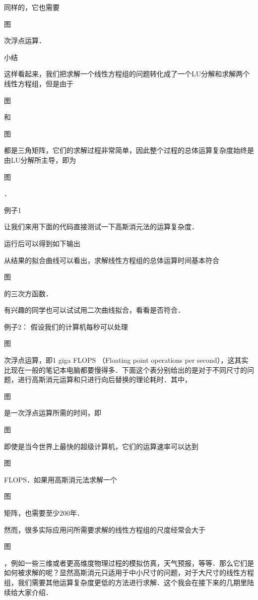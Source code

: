 同样的，它也需要

图

 次浮点运算．

小结

这样看起来，我们把求解一个线性方程组的问题转化成了一个LU分解和求解两个线性方程组，但是由于

图

 和

图

 都是三角矩阵，它们的求解过程非常简单，因此整个过程的总体运算复杂度始终是由LU分解所主导，即为

图

 ．

例子1

让我们来用下面的代码直接测试一下高斯消元法的运算复杂度．

运行后可以得到如下输出

从结果的拟合曲线可以看出，求解线性方程组的总体运算时间基本符合

图

 的三次方函数．
 
 有兴趣的同学也可以试试用二次曲线拟合，看看是否符合．

例子2： 假设我们的计算机每秒可以处理

图

 次浮点运算，即1 giga FLOPS （Floating point operations per second），这其实比现在一般的笔记本电脑都要慢得多．下面这个表分别给出的是对于不同尺寸的问题，进行高斯消元运算和只进行向后替换的理论耗时．其中，

图

 是一次浮点运算所需的时间，即

图

 
即使是当今世界上最快的超级计算机，它们的运算速率可以达到

图

 FLOPS．如果用高斯消元法求解一个

图

 矩阵，也需要至少200年．

然而，很多实际应用问所需要求解的线性方程组的尺度经常会大于

图

 ，例如一些三维或者更高维度物理过程的模拟仿真，天气预报，等等．那么它们是如何被求解的呢？显然高斯消元只适用于中小尺寸的问题，对于大尺寸的线性方程组，我们需要其他运算复杂度更低的方法进行求解．这个我会在接下来的几期里陆续给大家介绍．
